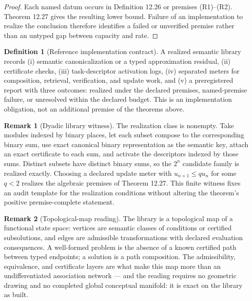 \documentclass[11pt]{article}
\theoremstyle{definition}
\newtheorem{definition}{Definition}
\newtheorem{remark}{Remark}
\begin{document}
\begin{proof}
Each named datum occurs in Definition 12.26 or premises (R1)--(R2). Theorem 12.27 gives the resulting lower bound. Failure of an implementation to realize the conclusion therefore identifies a failed or unverified premise rather than an untyped gap between capacity and rate.
\end{proof}

\begin{definition}[Reference implementation contract]
A realized semantic library records (i) semantic canonicalization or a typed approximation residual, (ii) certificate checks, (iii) task-descriptor activation logs, (iv) separated meters for composition, retrieval, verification, and update work, and (v) a preregistered report with three outcomes: realized under the declared premises, named-premise failure, or unresolved within the declared budget. This is an implementation obligation, not an additional premise of the theorems above.
\end{definition}

\begin{remark}[Dyadic library witness]
The realization class is nonempty. Take modules indexed by binary places, let each subset compose to the corresponding binary sum, use exact canonical binary representation as the semantic key, attach an exact certificate to each sum, and activate the descriptors indexed by those sums. Distinct subsets have distinct binary sums, so the $2^n$ candidate family is realized exactly. Choosing a declared update meter with $u_{n+1} \leq q u_n$ for some $q < 2$ realizes the algebraic premises of Theorem 12.27. This finite witness fixes an audit template for the realization conditions without altering the theorem's positive premise-complete statement.
\end{remark}

\begin{remark}[Topological-map reading]
The library is a topological map of a functional state space: vertices are semantic classes of conditions or certified subsolutions, and edges are admissible transformations with declared evaluation consequences. A well-formed problem is the absence of a known certified path between typed endpoints; a solution is a path composition. The admissibility, equivalence, and certificate layers are what make this map more than an undifferentiated association network --- and the reading requires no geometric drawing and no completed global conceptual manifold: it is exact on the library as built.
\end{remark}
\end{document}
